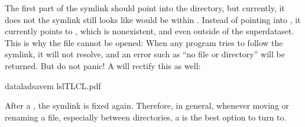 \sphinxAtStartPar
The first part of the symlink should point into the 
directory, but currently, it does not \textendash{} the symlink still looks
like  would be within . Instead of pointing
into , it currently points to , which is non\sphinxhyphen{}existent,
and even outside of the superdataset. This is why the file
cannot be opened: When any program tries to follow the symlink,
it will not resolve, and an error such as “no file or directory”
will be returned. But do not panic! A  will
rectify this as well:

\begin{sphinxVerbatim}[commandchars=\\\{\}]
dataladsave\PYGZhy{}m
ls\PYGZhy{}lTLCL.pdf
\end{sphinxVerbatim}

\sphinxAtStartPar
After a , the symlink is fixed again.
Therefore, in general, whenever moving or renaming a file,
especially between directories, a  is
the best option to turn to.

